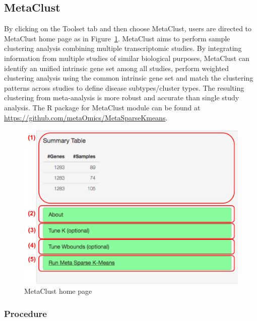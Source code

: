 \subsection{MetaClust}
By clicking on the Toolset tab and then choose MetaClust,
users are directed to MetaClust home page as in Figure~\ref{fig:metaClustHome}.
MetaClust \citep{huo2016meta} aims to perform sample clustering analysis combining multiple transcriptomic studies.
By integrating information from multiple studies of similar biological purposes,
MetaClust can identify an unified intrinsic gene set among all studies, perform weighted clustering analysis using the common intrinsic gene set and
match the clustering patterns across studies to define disease subtypes/cluster types.
The resulting clustering from meta-analysis is more robust and accurate than single study analysis.
The R package for MetaClust module can be found at \url{https://github.com/metaOmics/MetaSparseKmeans}.


\begin{figure}[H]
\begin{center}
\includegraphics[scale=0.4]{./figure/metaClust/metaClustHome.pdf}
\caption{MetaClust home page}
\label{fig:metaClustHome}
\end{center}
\end{figure}

\subsubsection{Procedure}


